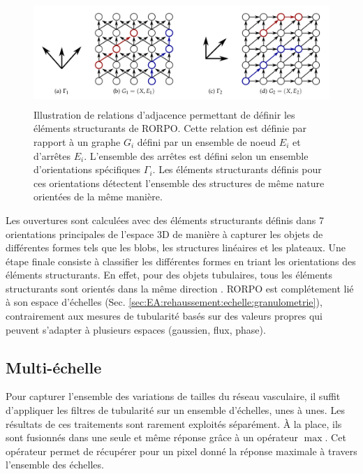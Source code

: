 \begin{figure}[ht]
\centering
\includegraphics[height=4cm]{Images/rorpo_path.png}
\caption{Illustration de relations d'adjacence permettant de définir les éléments structurants de RORPO. Cette relation est définie par rapport à un graphe $G_i$ défini par un ensemble de noeud $E_i$ et d'arrêtes $E_i$. L'ensemble des arrêtes est défini selon un ensemble d'orientations spécifiques $\Gamma_i$. Les éléments structurants définis pour ces orientations détectent l'ensemble des structures de même nature orientées de la même manière.}
\label{fig:rorpo_adjacency}
\end{figure}

Les ouvertures sont calculées avec des éléments structurants définis dans 7 orientations principales de l'espace 3D de manière à capturer les objets de différentes formes tels que les blobs, les structures linéaires et les plateaux. Une étape finale consiste à classifier les différentes formes en triant les orientations des éléments structurants. En effet, pour des objets tubulaires, tous les éléments structurants sont orientés dans la même direction . RORPO est complétement lié à son espace d'échelles (Sec. \ref{sec:EA:rehaussement:echelle:granulometrie}), contrairement aux mesures de tubularité basés sur des valeurs propres qui peuvent s'adapter à plusieurs espaces (gaussien, flux, phase).


\subsection{Multi-échelle}
  \label{sec:EA:rehaussement:echelle:multiScale}

   Pour capturer l'ensemble des variations de tailles du réseau vasculaire, il suffit d'appliquer les filtres de tubularité sur un ensemble d'échelles, unes à unes. Les résultats de ces traitements sont rarement exploités séparément. À la place, ils sont fusionnés dans une seule et même réponse grâce à un opérateur $\max$. Cet opérateur permet de récupérer pour un pixel donné la réponse maximale à travers l'ensemble des échelles.

